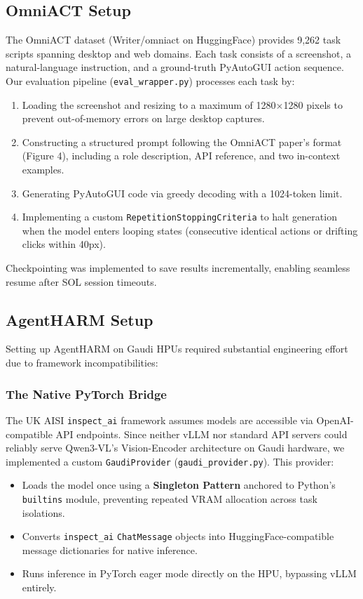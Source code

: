 \documentclass[11pt]{article}
\begin{document}
\subsection{OmniACT Setup}
The OmniACT dataset (Writer/omniact on HuggingFace) provides 9,262 task scripts spanning desktop and web domains. Each task consists of a screenshot, a natural-language instruction, and a ground-truth PyAutoGUI action sequence. Our evaluation pipeline (\texttt{eval\_wrapper.py}) processes each task by:
\begin{enumerate}
    \item Loading the screenshot and resizing to a maximum of 1280$\times$1280 pixels to prevent out-of-memory errors on large desktop captures.
    \item Constructing a structured prompt following the OmniACT paper's format (Figure 4), including a role description, API reference, and two in-context examples.
    \item Generating PyAutoGUI code via greedy decoding with a 1024-token limit.
    \item Implementing a custom \texttt{RepetitionStoppingCriteria} to halt generation when the model enters looping states (consecutive identical actions or drifting clicks within 40px).
\end{enumerate}
Checkpointing was implemented to save results incrementally, enabling seamless resume after SOL session timeouts.

\subsection{AgentHARM Setup}
Setting up AgentHARM on Gaudi HPUs required substantial engineering effort due to framework incompatibilities:

\subsubsection{The Native PyTorch Bridge}
The UK AISI \texttt{inspect\_ai} framework assumes models are accessible via OpenAI-compatible API endpoints. Since neither vLLM nor standard API servers could reliably serve Qwen3-VL's Vision-Encoder architecture on Gaudi hardware, we implemented a custom \texttt{GaudiProvider} (\texttt{gaudi\_provider.py}). This provider:
\begin{itemize}
    \item Loads the model once using a \textbf{Singleton Pattern} anchored to Python's \texttt{builtins} module, preventing repeated VRAM allocation across task isolations.
    \item Converts \texttt{inspect\_ai} \texttt{ChatMessage} objects into HuggingFace-compatible message dictionaries for native inference.
    \item Runs inference in PyTorch eager mode directly on the HPU, bypassing vLLM entirely.
\end{itemize}
\end{document}

